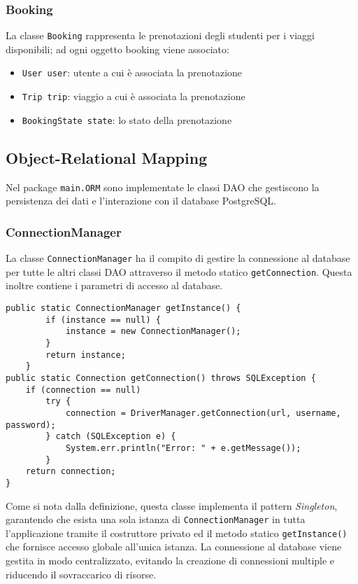 \subsubsection{Booking}
La classe \texttt{Booking} rappresenta le prenotazioni degli studenti per i viaggi disponibili; ad ogni oggetto booking viene associato:
\begin{itemize}
    \item \texttt{User user}: utente a cui è associata la prenotazione
    \item \texttt{Trip trip}: viaggio a cui è associata la prenotazione
    \item \texttt{BookingState state}: lo stato della prenotazione
\end{itemize}
\subsection{Object-Relational Mapping}
Nel package \texttt{main.ORM} sono implementate le classi DAO che gestiscono la persistenza dei dati e l'interazione con il database PostgreSQL.
\subsubsection{ConnectionManager}
La classe \texttt{ConnectionManager} ha il compito di gestire la connessione al database per tutte le altri classi DAO attraverso il metodo statico \texttt{getConnection}. Questa inoltre contiene i parametri di accesso al database.
\begin{lstlisting}[style=java, caption={Implementazione del ConnectionManager}]
public static ConnectionManager getInstance() {
        if (instance == null) {
            instance = new ConnectionManager();
        }
        return instance;
    }
public static Connection getConnection() throws SQLException {
    if (connection == null)
        try {
            connection = DriverManager.getConnection(url, username, password);
        } catch (SQLException e) {
            System.err.println("Error: " + e.getMessage());
        }
    return connection;
}
\end{lstlisting}
Come si nota dalla definizione, questa classe implementa il pattern \textit{Singleton}, garantendo che esista una sola istanza di \texttt{ConnectionManager} in tutta l'applicazione tramite il costruttore privato ed il metodo statico \texttt{getInstance()} che fornisce accesso globale all'unica istanza. La connessione al database viene gestita in modo centralizzato, evitando la creazione di connessioni multiple e riducendo il sovraccarico di risorse.

